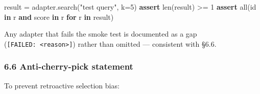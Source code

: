 \documentclass[
]{article}
\newenvironment{Shaded}{}{}
\newcommand{\BuiltInTok}[1]{\textcolor[rgb]{0.00,0.50,0.00}{#1}}
\newcommand{\ControlFlowTok}[1]{\textcolor[rgb]{0.00,0.44,0.13}{\textbf{#1}}}
\newcommand{\DecValTok}[1]{\textcolor[rgb]{0.25,0.63,0.44}{#1}}
\newcommand{\KeywordTok}[1]{\textcolor[rgb]{0.00,0.44,0.13}{\textbf{#1}}}
\newcommand{\NormalTok}[1]{#1}
\newcommand{\OperatorTok}[1]{\textcolor[rgb]{0.40,0.40,0.40}{#1}}
\newcommand{\StringTok}[1]{\textcolor[rgb]{0.25,0.44,0.63}{#1}}
\begin{document}
\begin{Shaded}
\begin{Highlighting}[]
\NormalTok{result }\OperatorTok{=}\NormalTok{ adapter.search(}\StringTok{"test query"}\NormalTok{, k}\OperatorTok{=}\DecValTok{5}\NormalTok{)}
\ControlFlowTok{assert} \BuiltInTok{len}\NormalTok{(result) }\OperatorTok{\textgreater{}=} \DecValTok{1}
\ControlFlowTok{assert} \BuiltInTok{all}\NormalTok{(}\StringTok{\textquotesingle{}id\textquotesingle{}} \KeywordTok{in}\NormalTok{ r }\KeywordTok{and} \StringTok{\textquotesingle{}score\textquotesingle{}} \KeywordTok{in}\NormalTok{ r }\ControlFlowTok{for}\NormalTok{ r }\KeywordTok{in}\NormalTok{ result)}
\end{Highlighting}
\end{Shaded}

Any adapter that fails the smoke test is documented as a gap
(\texttt{{[}FAILED:\ \textless{}reason\textgreater{}{]}}) rather than
omitted --- consistent with §6.6.

\subsubsection{6.6 Anti-cherry-pick
statement}\label{anti-cherry-pick-statement}

To prevent retroactive selection bias:
\end{document}
